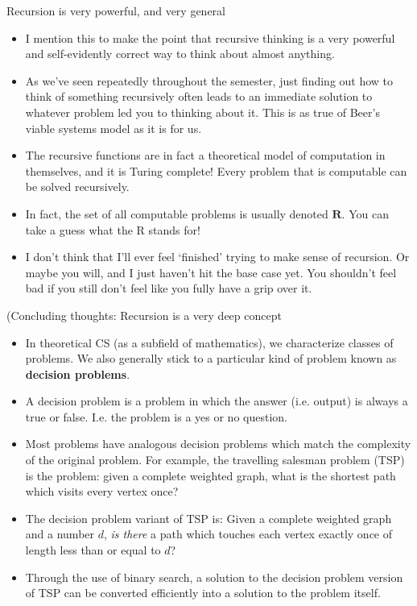\documentclass{beamer}
\begin{document}
\begin{frame}{Recursion is very powerful, and very general}
    \begin{itemize}
        \item I mention this to make the point that recursive thinking is a very powerful and self-evidently correct way to think about almost anything. 
        \item As we've seen repeatedly throughout the semester, just finding out how to think of something recursively often leads to an immediate solution to whatever problem led you to thinking about it. This is as true of Beer's viable systems model as it is for us. 
        \item The recursive functions are in fact a theoretical model of computation in themselves, and it is Turing complete! Every problem that is computable can be solved recursively. 
        \item In fact, the set of all computable problems is usually denoted $\mathbf{R}$. You can take a guess what the R stands for! 
        \item I don't think that I'll ever feel `finished' trying to make sense of recursion. Or maybe you will, and I just haven't hit the base case yet. You shouldn't feel bad if you still don't feel like you fully have a grip over it. 
    \end{itemize}     
\end{frame}

\begin{frame}{(Concluding thoughts: Recursion is a very deep concept}
    \begin{itemize}
        \item In theoretical CS (as a subfield of mathematics), we characterize classes of problems. We also generally stick to a particular kind of problem known as \textbf{decision problems}.
        \item A decision problem is a problem in which the answer (i.e. output) is always a true or false. I.e. the problem is a yes or no question. 
        \item Most problems have analogous decision problems which match the complexity of the original problem. For example, the travelling salesman problem (TSP) is the problem: given a complete weighted graph, what is the shortest path which visits every vertex once? 
        \item The decision problem variant of TSP is: Given a complete weighted graph and a number $d$, \emph{is there} a path which touches each vertex exactly once of length less than or equal to $d$?
        \item Through the use of binary search, a solution to the decision problem version of TSP can be converted efficiently into a solution to the problem itself. 
    \end{itemize}
\end{frame}
\end{document}
